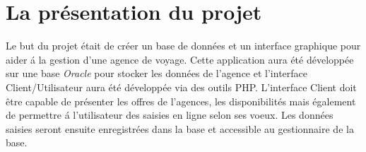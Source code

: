 \section{La pr\'esentation du projet}
Le but du projet \'etait de cr\'eer un base de donn\'ees et un interface graphique pour aider \'a la gestion d'une agence de voyage. Cette application aura \'et\'e d\'evelopp\'ee sur une base \textit{Oracle} pour stocker les donn\'ees de l'agence et l'interface Client/Utilisateur aura \'et\'e d\'evelopp\'ee via des outils PHP. L'interface Client doit \^etre capable de pr\'esenter les offres de l'agences, les disponibilit\'es mais \'egalement de permettre \'a l'utilisateur des saisies en ligne selon ses voeux. Les donn\'ees saisies seront ensuite enregistr\'ees dans la base et accessible au gestionnaire de la base.

